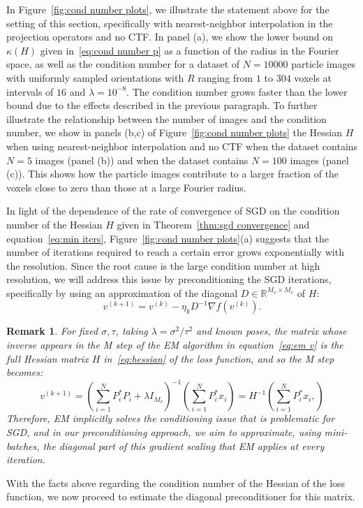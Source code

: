 \documentclass{article}
\newtheorem{remark}[theorem]{Remark}%
\begin{document}
In Figure~\ref{fig:cond number plots}, we illustrate the statement above for the
setting of this section, specifically with nearest-neighbor interpolation in the
projection operators and no CTF.
In panel (a), we show the lower bound on $\kappa(H)$ given in~\eqref{eq:cond number p} 
as a function of the radius in the Fourier space, as well as the condition number 
for a dataset of $N=10000$ particle images with uniformly sampled orientations 
with $R$ ranging from $1$ to $304$ voxels at intervals of $16$ and $\lambda = 10^{-8}$.
The condition number grows faster than the lower bound due to the effects 
described in the previous paragraph.
To further illustrate the relationship between the number of images and the condition 
number, we show in panels (b,c) of Figure~\ref{fig:cond number plots} the Hessian $H$ 
when using nearest-neighbor interpolation and no CTF when the dataset contains 
$N=5$ images (panel (b)) and when the dataset contains $N=100$ images (panel (c)). 
This shows how the particle images contribute to a larger fraction of the voxels 
close to zero than those at a large Fourier radius.

In light of the dependence of the rate of convergence of SGD on the condition 
number of the Hessian $H$ given in Theorem~\ref{thm:sgd convergence} and 
equation~\eqref{eq:min iters}, Figure~\ref{fig:cond number plots}(a) suggests 
that the number of iterations required to reach a certain error grows exponentially 
with the resolution. 
Since the root cause is the large condition number at high resolution, we will
address this issue by preconditioning the SGD iterations, specifically by using
an approximation of the diagonal $D \in \mathbb{R}^{M_v \times M_v}$ of $H$:
\begin{equation}
    v^{(k+1)} = v^{(k)} - \eta_k D^{-1} \nabla f(v^{(k)}).
    \label{eq:sgd step}
\end{equation}
\begin{remark}
    For fixed $\sigma, \tau$, taking $\lambda=\sigma^2/\tau^2$ and known poses, 
    the matrix whose inverse appears in the M step of the EM algorithm in 
    equation~\eqref{eq:em v} is the full Hessian matrix $H$ in~\eqref{eq:hessian} 
    of the loss function, and so the M step becomes: 
    \begin{equation*}
        v^{(k+1)} = \left(
            \sum_{i=1}^N P_i^* P_i + \lambda I_{M_v}
        \right)^{-1} 
        \left(
            \sum_{i=1}^N P_i^* x_i
        \right)
        = H^{-1} 
        \left(
            \sum_{i=1}^N P_i^* x_i,
        \right)
    \end{equation*}
    Therefore, EM implicitly solves the conditioning issue 
    that is problematic for SGD, and in our preconditioning approach, we aim to 
    approximate, using mini-batches, the diagonal part of
    this gradient scaling that EM applies at every iteration.
\end{remark}
With the facts above regarding the condition number of the Hessian of the loss function,
we now proceed to estimate the diagonal preconditioner for this matrix.
\end{document}
